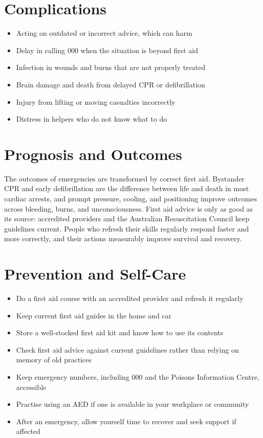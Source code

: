 \section*{Complications}
\begin{itemize}
    \item Acting on outdated or incorrect advice, which can harm
    \item Delay in calling 000 when the situation is beyond first aid
    \item Infection in wounds and burns that are not properly treated
    \item Brain damage and death from delayed CPR or defibrillation
    \item Injury from lifting or moving casualties incorrectly
    \item Distress in helpers who do not know what to do
\end{itemize}

\section*{Prognosis and Outcomes}
The outcomes of emergencies are transformed by correct first aid. Bystander CPR and early defibrillation are the difference between life and death in most cardiac arrests, and prompt pressure, cooling, and positioning improve outcomes across bleeding, burns, and unconsciousness. First aid advice is only as good as its source: accredited providers and the Australian Resuscitation Council keep guidelines current. People who refresh their skills regularly respond faster and more correctly, and their actions measurably improve survival and recovery.

\section*{Prevention and Self-Care}
\begin{itemize}
    \item Do a first aid course with an accredited provider and refresh it regularly
    \item Keep current first aid guides in the home and car
    \item Store a well-stocked first aid kit and know how to use its contents
    \item Check first aid advice against current guidelines rather than relying on memory of old practices
    \item Keep emergency numbers, including 000 and the Poisons Information Centre, accessible
    \item Practise using an AED if one is available in your workplace or community
    \item After an emergency, allow yourself time to recover and seek support if affected
\end{itemize}


